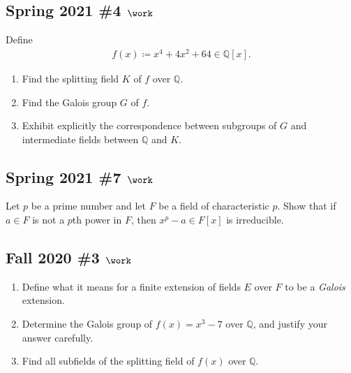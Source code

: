\hypertarget{spring-2021-4-work}{%
\subsection{\texorpdfstring{Spring 2021 \#4
\(\work\)}{Spring 2021 \#4 \textbackslash work}}\label{spring-2021-4-work}}

Define
\begin{align*}
f(x) \coloneqq x^4 + 4x^2 + 64 \in {\mathbb{Q}}[x]
.\end{align*}

\begin{enumerate}
\def\labelenumi{\alph{enumi}.}
\item
  Find the splitting field \(K\) of \(f\) over \({\mathbb{Q}}\).
\item
  Find the Galois group \(G\) of \(f\).
\item
  Exhibit explicitly the correspondence between subgroups of \(G\) and
  intermediate fields between \({\mathbb{Q}}\) and \(K\).
\end{enumerate}

\hypertarget{spring-2021-7-work}{%
\subsection{\texorpdfstring{Spring 2021 \#7
\(\work\)}{Spring 2021 \#7 \textbackslash work}}\label{spring-2021-7-work}}

Let \(p\) be a prime number and let \(F\) be a field of characteristic
\(p\). Show that if \(a\in F\) is not a \(p\)th power in \(F\), then
\(x^p-a \in F[x]\) is irreducible.

\hypertarget{fall-2020-3-work}{%
\subsection{\texorpdfstring{Fall 2020 \#3
\(\work\)}{Fall 2020 \#3 \textbackslash work}}\label{fall-2020-3-work}}

\begin{enumerate}
\def\labelenumi{\alph{enumi}.}
\item
  Define what it means for a finite extension of fields \(E\) over \(F\)
  to be a \emph{Galois} extension.
\item
  Determine the Galois group of \(f(x) = x^3 - 7\) over
  \({\mathbb{Q}}\), and justify your answer carefully.
\item
  Find all subfields of the splitting field of \(f(x)\) over
  \({\mathbb{Q}}\).
\end{enumerate}

